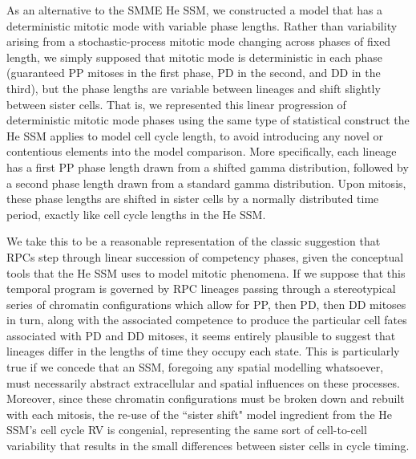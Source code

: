 As an alternative to the SMME He SSM, we constructed a model that has a deterministic mitotic mode with variable phase lengths. Rather than variability arising from a stochastic-process mitotic mode changing across phases of fixed length, we simply supposed that mitotic mode is deterministic in each phase (guaranteed PP mitoses in the first phase, PD in the second, and DD in the third), but the phase lengths are variable between lineages and shift slightly between sister cells. That is, we represented this linear progression of deterministic mitotic mode phases using the same type of statistical construct the He SSM applies to model cell cycle length, to avoid introducing any novel or contentious elements into the model comparison. More specifically, each lineage has a first PP phase length drawn from a shifted gamma distribution, followed by a second phase length drawn from a standard gamma distribution. Upon mitosis, these phase lengths are shifted in sister cells by a normally distributed time period, exactly like cell cycle lengths in the He SSM.

We take this to be a reasonable representation of the classic suggestion that RPCs step through linear succession of competency phases, given the conceptual tools that the He SSM uses to model mitotic phenomena. If we suppose that this temporal program is governed by RPC lineages passing through a stereotypical series of chromatin configurations which allow for PP, then PD, then DD mitoses in turn, along with the associated competence to produce the particular cell fates associated with PD and DD mitoses, it seems entirely plausible to suggest that lineages differ in the lengths of time they occupy each state. This is particularly true if we concede that an SSM, foregoing any spatial modelling whatsoever, must necessarily abstract extracellular and spatial influences on these processes. Moreover, since these chromatin configurations must be broken down and rebuilt with each mitosis, the re-use of the ``sister shift" model ingredient from the He SSM's cell cycle RV is congenial, representing the same sort of cell-to-cell variability that results in the small differences between sister cells in cycle timing. 

